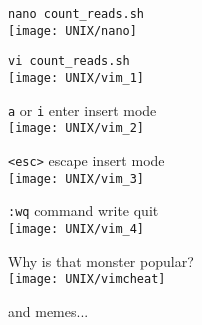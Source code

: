\documentclass[xcolor=dvipsnames]{beamer}
\begin{document}
\begin{frame}[fragile]
	\begin{center}
		\Large
		\verb!nano count_reads.sh! \\
		\vspace{1cm}
		\texttt{[image: UNIX/nano]}
	\end{center}
\end{frame}

\begin{frame}[fragile]
	\begin{center}
		\Large
		\verb!vi count_reads.sh! \\
		\vspace{1cm}
		\texttt{[image: UNIX/vim\_1]}
	\end{center}
\end{frame}

\begin{frame}[fragile]
	\begin{center}
		\Large
		\verb!a! or \verb!i! enter insert mode \\
		\vspace{1cm}
		\texttt{[image: UNIX/vim\_2]}
	\end{center}
\end{frame}

\begin{frame}[fragile]
	\begin{center}
		\Large
		\verb!<esc>! escape insert mode\\
		\vspace{1cm}
		\texttt{[image: UNIX/vim\_3]}
	\end{center}
\end{frame}

\begin{frame}[fragile]
	\begin{center}
		\Large
		\verb!:wq! command write quit\\
		\vspace{1cm}
		\texttt{[image: UNIX/vim\_4]}
	\end{center}
\end{frame}

\begin{frame}
	\begin{center}
		\Huge
		Why is that monster popular?\\
		\vspace{1cm}
		\texttt{[image: UNIX/vimcheat]}
	\end{center}
	\hfill and memes...
\end{frame}
\end{document}
